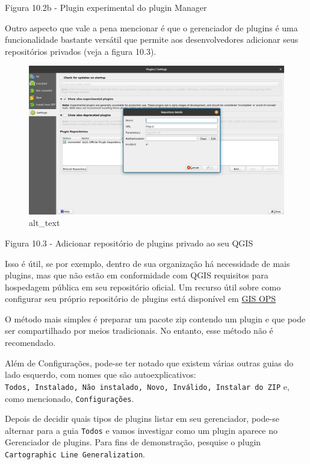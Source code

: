 \documentclass[
]{book}
\begin{document}
Figura 10.2b - Plugin experimental do plugin Manager

Outro aspecto que vale a pena mencionar é que o gerenciador de plugins é uma funcionalidade bastante versátil que permite aos desenvolvedores adicionar seus repositórios privados (veja a figura 10.3).

\begin{figure}
\centering
\includegraphics{media/modulo10/fig103.png}
\caption{alt\_text}
\end{figure}

Figura 10.3 - Adicionar repositório de plugins privado ao seu QGIS

Isso é útil, se por exemplo, dentro de sua organização há necessidade de mais plugins, mas que não estão em conformidade com QGIS requisitos para hospedagem pública em seu repositório oficial. Um recurso útil sobre como configurar seu próprio repositório de plugins está disponível em \href{https://gis-ops.com/qgis-3-plugin-tutorial-set-up-a-plugin-repository-explained/}{GIS OPS}

O método mais simples é preparar um pacote zip contendo um plugin e que pode ser compartilhado por meios tradicionais. No entanto, esse método não é recomendado.

Além de Configurações, pode-se ter notado que existem várias outras guias do lado esquerdo, com nomes que são autoexplicativos: \texttt{Todos,\ Instalado,\ Não\ instalado,\ Novo,\ Inválido,\ Instalar\ do\ ZIP} e, como mencionado, \texttt{Configurações}.

Depois de decidir quais tipos de plugins listar em seu gerenciador, pode-se alternar para a guia \texttt{Todos} e vamos investigar como um plugin aparece no Gerenciador de plugins. Para fins de demonstração, pesquise o plugin \texttt{Cartographic\ Line\ Generalization}.
\end{document}
